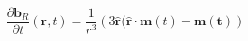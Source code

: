 \begin{equation}
    \frac{\partial \mathbf{b}_R}{\partial t}(\mathbf{r}, t) =
    \frac{1}{r^3}\left(3\mathbf{\hat{r}} (\mathbf{\hat{r}} \cdot \mathbf{m}(t) - \mathbf{m(t)}\right)
    \label{eq:uxo-data}
\end{equation}
